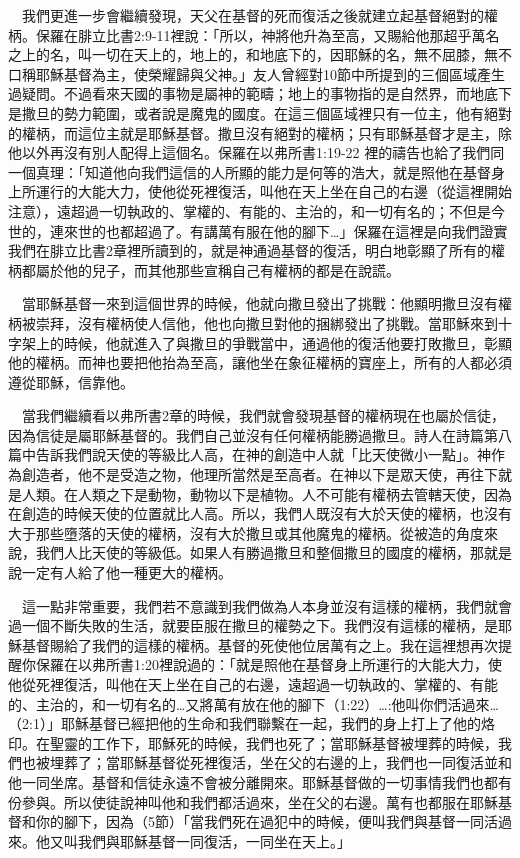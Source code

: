 \documentclass{book}
\begin{document}
　我們更進一步會繼續發現，天父在基督的死而復活之後就建立起基督絕對的權柄。保羅在腓立比書2:9-11裡說：「所以，神將他升為至高，又賜給他那超乎萬名之上的名，叫一切在天上的，地上的，和地底下的，因耶穌的名，無不屈膝，無不口稱耶穌基督為主，使榮耀歸與父神。」友人曾經對10節中所提到的三個區域產生過疑問。不過看來天國的事物是屬神的範疇；地上的事物指的是自然界，而地底下是撒旦的勢力範圍，或者說是魔鬼的國度。在這三個區域裡只有一位主，他有絕對的權柄，而這位主就是耶穌基督。撒旦沒有絕對的權柄；只有耶穌基督才是主，除他以外再沒有別人配得上這個名。保羅在以弗所書1:19-22 裡的禱告也給了我們同一個真理：「知道他向我們這信的人所顯的能力是何等的浩大，就是照他在基督身上所運行的大能大力，使他從死裡復活，叫他在天上坐在自己的右邊（從這裡開始注意），遠超過一切執政的、掌權的、有能的、主治的，和一切有名的；不但是今世的，連來世的也都超過了。有講萬有服在他的腳下…」保羅在這裡是向我們證實我們在腓立比書2章裡所讀到的，就是神通過基督的復活，明白地彰顯了所有的權柄都屬於他的兒子，而其他那些宣稱自己有權柄的都是在說謊。

　當耶穌基督一來到這個世界的時候，他就向撒旦發出了挑戰：他顯明撒旦沒有權柄被崇拜，沒有權柄使人信他，他也向撒旦對他的捆綁發出了挑戰。當耶穌來到十字架上的時候，他就進入了與撒旦的爭戰當中，通過他的復活他要打敗撒旦，彰顯他的權柄。而神也要把他抬為至高，讓他坐在象征權柄的寶座上，所有的人都必須遵從耶穌，信靠他。

　當我們繼續看以弗所書2章的時候，我們就會發現基督的權柄現在也屬於信徒，因為信徒是屬耶穌基督的。我們自己並沒有任何權柄能勝過撒旦。詩人在詩篇第八篇中告訴我們說天使的等級比人高，在神的創造中人就「比天使微小一點」。神作為創造者，他不是受造之物，他理所當然是至高者。在神以下是眾天使，再往下就是人類。在人類之下是動物，動物以下是植物。人不可能有權柄去管轄天使，因為在創造的時候天使的位置就比人高。所以，我們人既沒有大於天使的權柄，也沒有大于那些墮落的天使的權柄，沒有大於撒旦或其他魔鬼的權柄。從被造的角度來說，我們人比天使的等級低。如果人有勝過撒旦和整個撒旦的國度的權柄，那就是說一定有人給了他一種更大的權柄。

　這一點非常重要，我們若不意識到我們做為人本身並沒有這樣的權柄，我們就會過一個不斷失敗的生活，就要臣服在撒旦的權勢之下。我們沒有這樣的權柄，是耶穌基督賜給了我們的這樣的權柄。基督的死使他位居萬有之上。我在這裡想再次提醒你保羅在以弗所書1:20裡說過的：「就是照他在基督身上所運行的大能大力，使他從死裡復活，叫他在天上坐在自己的右邊，遠超過一切執政的、掌權的、有能的、主治的，和一切有名的…又將萬有放在他的腳下（1:22）…:他叫你們活過來…（2:1）」耶穌基督已經把他的生命和我們聯繫在一起，我們的身上打上了他的烙印。在聖靈的工作下，耶穌死的時候，我們也死了；當耶穌基督被埋葬的時候，我們也被埋葬了；當耶穌基督從死裡復活，坐在父的右邊的上，我們也一同復活並和他一同坐席。基督和信徒永遠不會被分離開來。耶穌基督做的一切事情我們也都有份參與。所以使徒說神叫他和我們都活過來，坐在父的右邊。萬有也都服在耶穌基督和你的腳下，因為（5節）「當我們死在過犯中的時候，便叫我們與基督一同活過來。他又叫我們與耶穌基督一同復活，一同坐在天上。」
\end{document}
